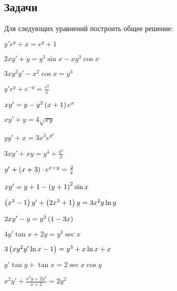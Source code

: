\subsection{Задачи}
	
	Для следующих уравнений построить общее решение:
	\begin{multicols}{2}
		\begin{enumtasks}

			\label{firstorder:to_linear}
			\item \( y' e^{y} + x = e^{y} + 1 \)																		%
			\item \( 2xy' + y = y^3\sin{x} - xy^3 \cos{x} \)															%
			\item \( 3xy^2 y' - x^2 \cos{x} = y^3 \)																	%
			\item \( y' e^{y} + e^{-y} = \frac{e^{y}}{x} \)																%
			\item \( xy' = y - y^2 \left( x + 1 \right) e^{x} \)																%
			\item \( xy' + y = 4 \sqrt{xy} \)																			%
			\item \( yy' + x = 3 x^3 e^{y^2} \)																			%
			\item \( 3xy' + xy = y^4 + \frac{y^4}{x} \)																	%
			\item \( y' + \left( x + 3 \right) \cdot e^{x + y} = \frac{2}{x} \)												%
			\item \( xy' = y + 1 - \left( y + 1 \right)^2 \sin{x} \)															%
			\item \( \left( x^3 - 1 \right) y' + \left( 2x^3 + 1 \right) y = 3 x^2 y \ln{y} \)										%
			\item \( 2xy' - y = y^2 \left( 1 - 3x \right) \)																	%
			\item \( 4y' \tan{x} + 2y = y^3 \sec{x} \)																	%
			\item \( 3 \left( xy^2 y' \ln{x} - 1 \right) = y^3 + x \ln{x} + x \)												%
			\item \( y' \tan{y} + \tan{x} = 2 \sec{x} \cos{y} \)														%
			\item \( x^2 y' + \frac{x^2y + 2y^2}{x + 2} = 2y^2 \)														%

\end{enumtasks}
\end{multicols}
